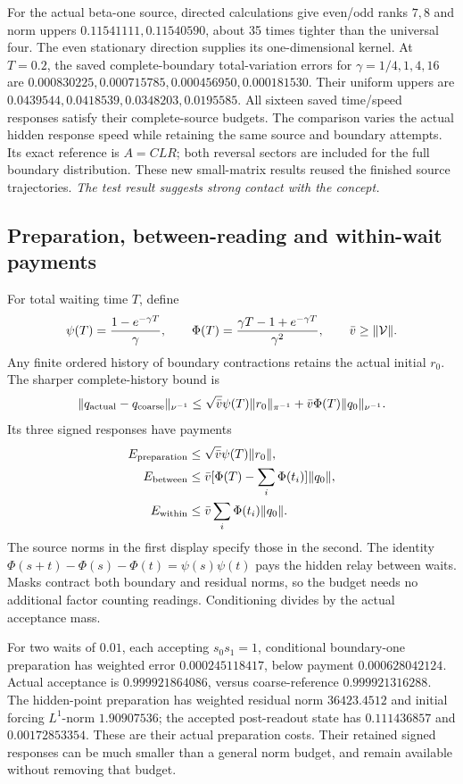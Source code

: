 For the actual beta-one source, directed calculations give even/odd
ranks \(7,8\) and norm uppers \(0.11541111,0.11540590\), about 35 times
tighter than the universal four. The even stationary direction supplies
its one-dimensional kernel. At \(T=0.2\), the saved complete-boundary
total-variation errors for \(\gamma=1/4,1,4,16\) are
\(0.000830225,0.000715785,0.000456950,0.000181530\).
Their uniform uppers are
\(0.0439544,\allowbreak0.0418539,\allowbreak0.0348203,\allowbreak0.0195585\).
All sixteen saved time/speed responses satisfy their complete-source
budgets. The comparison varies the actual hidden response speed while
retaining the same source and boundary attempts. Its exact reference
is \(A=CLR\); both reversal sectors are included for the full boundary
distribution. These new small-matrix results reused the finished source
trajectories.
\emph{The test result suggests strong contact with the concept.}

\subsection{Preparation, between-reading and within-wait payments}

For total waiting time \(T\), define
\[
 \psi(T)=\frac{1-e^{-\gamma T}}\gamma,\qquad
 \Phi(T)=\frac{\gamma T-1+e^{-\gamma T}}{\gamma^2},
 \qquad\bar v\geq\|{\cal V}\|.
\]
Any finite ordered history of boundary contractions retains the actual
initial \(r_0\). The sharper complete-history bound is
\[
 \|q_{\rm actual}-q_{\rm coarse}\|_{\nu^{-1}}
 \leq\sqrt{\bar v}\psi(T)\|r_0\|_{\pi^{-1}}
      +\bar v\Phi(T)\|q_0\|_{\nu^{-1}}.
\]
Its three signed responses have payments
\[
\begin{split}
 E_{\rm preparation}&\leq\sqrt{\bar v}\psi(T)\|r_0\|,\\
 E_{\rm between}&\leq\bar v
       [\Phi(T)-\sum_i\Phi(t_i)]\|q_0\|,\\
 E_{\rm within}&\leq\bar v\sum_i\Phi(t_i)\|q_0\|.
\end{split}
\]
The source norms in the first display specify those in the second.
The identity \(\Phi(s+t)-\Phi(s)-\Phi(t)=\psi(s)\psi(t)\)
pays the hidden relay between waits. Masks contract both boundary and
residual norms, so the budget needs no additional factor counting
readings. Conditioning divides by the actual acceptance mass.

For two waits of \(0.01\), each accepting \(s_0s_1=1\), conditional
boundary-one preparation has weighted error \(0.000245118417\),
below payment \(0.000628042124\). Actual acceptance is
\(0.999921864086\), versus coarse-reference \(0.999921316288\).
The hidden-point preparation has weighted residual norm \(36423.4512\)
and initial forcing \(L^1\)-norm \(1.90907536\); the accepted
post-readout state has \(0.111436857\) and \(0.00172853354\).
These are their actual preparation costs. Their retained signed
responses can be much smaller than a general norm budget, and remain
available without removing that budget.

